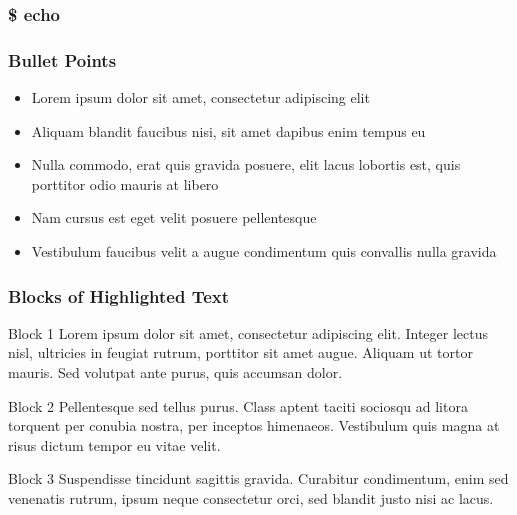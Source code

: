 \documentclass{beamer}
\begin{document}
\begin{frame}\frametitle{\$ echo}
 \par
\vspace{0.15cm}
 \par
\vspace{0.15cm}
\end{frame}


\begin{frame}
\frametitle{Bullet Points}
\begin{itemize}
\item Lorem ipsum dolor sit amet, consectetur adipiscing elit
\item Aliquam blandit faucibus nisi, sit amet dapibus enim tempus eu
\item Nulla commodo, erat quis gravida posuere, elit lacus lobortis est, quis porttitor odio mauris at libero
\item Nam cursus est eget velit posuere pellentesque
\item Vestibulum faucibus velit a augue condimentum quis convallis nulla gravida
\end{itemize}
\end{frame}


\begin{frame}
\frametitle{Blocks of Highlighted Text}
\begin{block}{Block 1}
Lorem ipsum dolor sit amet, consectetur adipiscing elit. Integer lectus nisl, ultricies in feugiat rutrum, porttitor sit amet augue. Aliquam ut tortor mauris. Sed volutpat ante purus, quis accumsan dolor.
\end{block}

\begin{block}{Block 2}
Pellentesque sed tellus purus. Class aptent taciti sociosqu ad litora torquent per conubia nostra, per inceptos himenaeos. Vestibulum quis magna at risus dictum tempor eu vitae velit.
\end{block}

\begin{block}{Block 3}
Suspendisse tincidunt sagittis gravida. Curabitur condimentum, enim sed venenatis rutrum, ipsum neque consectetur orci, sed blandit justo nisi ac lacus.
\end{block}
\end{frame}
\end{document}
